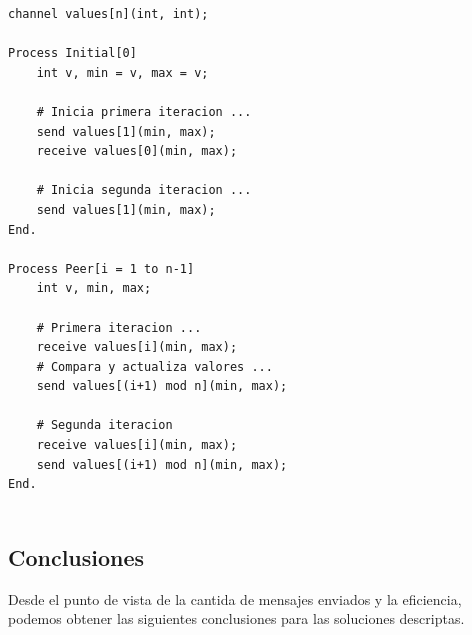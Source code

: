 \documentclass[a4paper, 10pt]{report}
\begin{document}
\begin{multicols}{2}
\begin{lstlisting}
channel values[n](int, int);

Process Initial[0]
    int v, min = v, max = v;

    # Inicia primera iteracion ...
    send values[1](min, max);
    receive values[0](min, max);

    # Inicia segunda iteracion ...
    send values[1](min, max);
End.
        
Process Peer[i = 1 to n-1]
    int v, min, max;

    # Primera iteracion ...
    receive values[i](min, max);
    # Compara y actualiza valores ...
    send values[(i+1) mod n](min, max);

    # Segunda iteracion
    receive values[i](min, max);
    send values[(i+1) mod n](min, max);
End.
    

\end{lstlisting}
    
\columnbreak
    
\centering
\vspace*{\fill}
\vspace*{\fill}
\end{multicols}

\subsection{Conclusiones}

Desde el punto de vista de la cantida de mensajes enviados y la eficiencia, podemos obtener las siguientes conclusiones para las soluciones descriptas.
\end{document}

